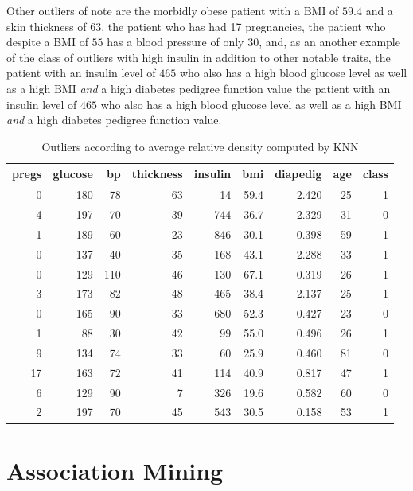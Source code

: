Other outliers of note are the morbidly obese patient with a BMI of $59.4$
and a skin thickness of 63,
the patient who has had 17 pregnancies,
the patient who despite a BMI of $55$ has a blood pressure of only $30$,
and,
as an another example of the class of outliers with high insulin
in addition to other notable traits,
the patient with an insulin level of $465$
who also has a high blood glucose level as well as a high BMI
\emph{and} a high diabetes pedigree function value
the patient with an insulin level of $465$
who also has a high blood glucose level as well as a high BMI
\emph{and} a high diabetes pedigree function value.



\begin{table}[hbp]
\begin{tabular}{rrrrrrrrr}
pregs & glucose & bp & thickness & insulin & bmi & dia\textunderscore{}pedig & age & class\\
  \hline
0 & 180 & 78 & 63 & 14 & 59.4 & 2.420 & 25 & 1\\
4 & 197 & 70 & 39 & 744 & 36.7 & 2.329 & 31 & 0\\
1 & 189 & 60 & 23 & 846 & 30.1 & 0.398 & 59 & 1\\
0 & 137 & 40 & 35 & 168 & 43.1 & 2.288 & 33 & 1\\
0 & 129 & 110 & 46 & 130 & 67.1 & 0.319 & 26 & 1\\
3 & 173 & 82 & 48 & 465 & 38.4 & 2.137 & 25 & 1\\
0 & 165 & 90 & 33 & 680 & 52.3 & 0.427 & 23 & 0\\
1 & 88 & 30 & 42 & 99 & 55.0 & 0.496 & 26 & 1\\
9 & 134 & 74 & 33 & 60 & 25.9 & 0.460 & 81 & 0\\
17 & 163 & 72 & 41 & 114 & 40.9 & 0.817 & 47 & 1\\
6 & 129 & 90 & 7 & 326 & 19.6 & 0.582 & 60 & 0\\
2 & 197 & 70 & 45 & 543 & 30.5 & 0.158 & 53 & 1\\
\end{tabular}
\caption{Outliers according to average relative density computed by KNN}
\label{tab:outliers}
\end{table}


\section{Association Mining}


